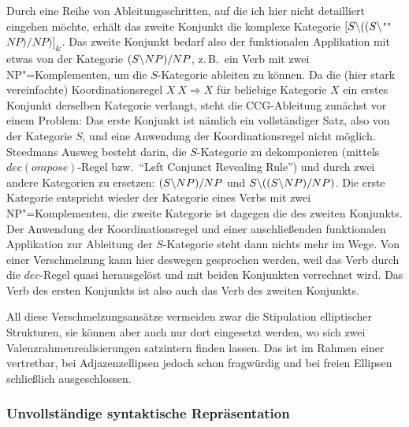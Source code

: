 Durch eine Reihe von Ableitungsschritten, auf die ich hier nicht detailliert eingehen möchte, erhält das zweite Konjunkt die komplexe Kategorie $[S\backslash ((S\backslash$""$\mathit{NP})/\mathit{NP})]_\&$. Das zweite Konjunkt bedarf also der funktionalen Applikation mit etwas von der Kategorie $(S\backslash NP)/NP$, z.\,B.\ ein Verb mit zwei NP"=Komplementen, um die $S$-Kategorie ableiten zu können. Da die (hier stark vereinfachte) Koordinationsregel $X ~ X \Rightarrow X$ für beliebige Kategorie $X$ ein erstes Konjunkt derselben Kategorie verlangt, steht die CCG-Ableitung zunächst vor einem Problem: Das erste Konjunkt ist nämlich ein vollständiger Satz, also von der Kategorie $S$, und eine Anwendung der Koordinationsregel nicht möglich. Steedmans Ausweg besteht darin, die $S$-Kategorie zu dekomponieren (mittels $dec(ompose)$-Regel bzw.\ "`Left Conjunct Revealing Rule"') und durch zwei andere Kategorien zu ersetzen: $(S\backslash NP)/NP$ und $S\backslash((S\backslash NP)/NP)$. Die erste Kategorie entspricht wieder der Kategorie eines Verbs mit zwei NP"=Komplementen, die zweite Kategorie ist dagegen die des zweiten Konjunkts. Der Anwendung der Koordinationsregel und einer anschlie\ss enden funktionalen Applikation zur Ableitung der $S$-Kategorie steht dann nichts mehr im Wege. Von einer Verschmelzung kann hier deswegen gesprochen werden, weil das Verb durch die $dec$-Regel quasi herausgelöst und mit beiden Konjunkten verrechnet wird. Das Verb des ersten Konjunkts ist also auch das Verb des zweiten Konjunkts. 

All diese Verschmelzungsansätze vermeiden zwar die Stipulation elliptischer Strukturen, sie können aber auch nur dort eingesetzt werden, wo sich zwei Valenzrahmenrealisierungen satzintern finden lassen. Das ist im Rahmen einer  vertretbar, bei Adjazenzellipsen jedoch schon fragwürdig und bei freien Ellipsen schlie\ss lich ausgeschlossen.

\subsubsection*{Unvollständige syntaktische Repräsentation}  

